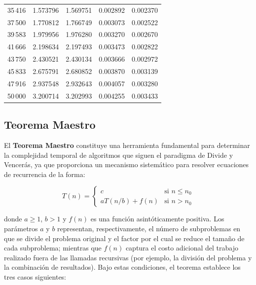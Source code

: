 \begin{table}[!h]
\begin{tabular}{r|rrrr}
        35\,416 & 1.573796        & 1.569751        & 0.002892     & 0.002370  \\
        37\,500 & 1.770812        & 1.766749        & 0.003073     & 0.002522  \\
        39\,583 & 1.979956        & 1.976280        & 0.003270     & 0.002670  \\
        41\,666 & 2.198634        & 2.197493        & 0.003473     & 0.002822  \\
        43\,750 & 2.430521        & 2.430134        & 0.003666     & 0.002972  \\
        45\,833 & 2.675791        & 2.680852        & 0.003870     & 0.003139  \\
        47\,916 & 2.937548        & 2.932643        & 0.004057     & 0.003280  \\
        50\,000 & 3.200714        & 3.202993        & 0.004255     & 0.003433  \\
        \hline
    \end{tabular}
\end{table}



\newpage
\subsection{Teorema Maestro}\label{sec:teorema-maestro}

El \textbf{Teorema Maestro} constituye una herramienta fundamental para determinar la complejidad temporal de algoritmos que siguen el paradigma de Divide y Vencerás, ya que proporciona un mecanismo sistemático para resolver ecuaciones de recurrencia de la forma:

\[
T(n) =
\begin{cases}
  c & \text{si } n \leq n_0 \\[4pt]
  aT(n/b) + f(n) & \text{si } n > n_0
\end{cases}
\]

donde $a \geq 1$, $b > 1$ y $f(n)$ es una función asintóticamente positiva. Los parámetros $a$ y $b$ representan, respectivamente, el número de subproblemas en que se divide el problema original y el factor por el cual se reduce el tamaño de cada subproblema; mientras que $f(n)$ captura el costo adicional del trabajo realizado fuera de las llamadas recursivas (por ejemplo, la división del problema y la combinación de resultados). Bajo estas condiciones, el teorema establece los tres casos siguientes:

